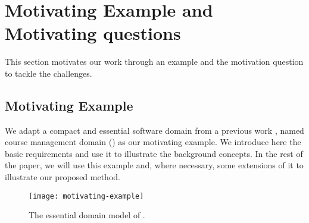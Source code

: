 \section{Motivating Example and Motivating questions} \label{sect:background}

This section motivates our work through an example and the motivation question to tackle the challenges.
\subsection{Motivating Example} 
\label{sect:bg-courseman-eg}

We adapt a compact and essential software domain from a previous work \cite{le_domain_2018}, named course management domain (\courseman) as our motivating example. We introduce here the basic \courseman requirements and use it to illustrate the background concepts. In the rest of the paper, we will use this example and, where necessary, some extensions of it to illustrate our proposed method.

\begin{figure}[th]
\begin{center}
\texttt{[image: motivating-example]}
\end{center}
\caption{The essential domain model of \courseman.}
\label{fig:motivatingExample}
\end{figure}

